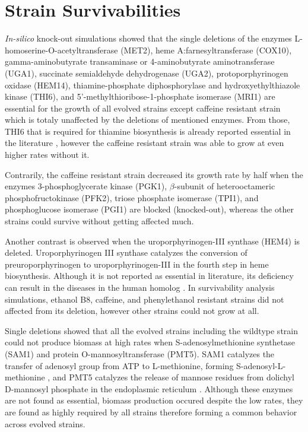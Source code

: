 \section{Strain Survivabilities}
\emph{In-silico} knock-out simulations showed that the single deletions of the enzymes L-homoserine-O-acetyltransferase (MET2), heme A:farnesyltransferase (COX10), gamma-aminobutyrate transaminase or 4-aminobutyrate aminotransferase (UGA1), succinate semialdehyde dehydrogenase (UGA2), protoporphyrinogen oxidase (HEM14), thiamine-phosphate diphosphorylase and hydroxyethylthiazole kinase (THI6), and 5'-methylthioribose-1-phosphate isomerase (MRI1) are essential for the growth of all evolved strains except caffeine resistant strain which is totaly unaffected by the deletions of mentioned enzymes. From those, THI6 that is required for thiamine biosynthesis is already reported essential in the literature \cite{nosaka1994isolation}, however the caffeine resistant strain was able to grow at even higher rates without it.

Contrarily, the caffeine resistant strain decreased its growth rate by half when the enzymes 3-phosphoglycerate kinase (PGK1), $\beta $-subunit of heterooctameric phosphofructokinase (PFK2), triose phosphate isomerase (TPI1), and phosphoglucose isomerase (PGI1) are blocked (knocked-out), whereas the other strains could survive without getting affected much.

Another contrast is observed when the uroporphyrinogen-III synthase (HEM4) is deleted. Uroporphyrinogen III synthase catalyzes the conversion of preuroporphyrinogen to uroporphyrinogen-III in the fourth step in heme biosynthesis\cite{amillet1995isolation}. Although it is not reported as essential in literature, its deficiency can result in the diseases in the human homolog \cite{tan2008identification}. In survivability analysis simulations, ethanol B8, caffeine, and phenylethanol resistant strains did not affected from its deletion, however other strains could not grow at all.

Single deletions showed that all the evolved strains including the wildtype strain could not produce biomass at high rates when S-adenosylmethionine synthetase (SAM1) and protein O-mannosyltransferase (PMT5). SAM1 catalyzes the transfer of adenosyl group from ATP to L-methionine, forming S-adenosyl-L-methionine \cite{chiang1977activation}, and PMT5 catalyzes the release of mannose residues from dolichyl D-mannosyl phosphate in the endoplasmic reticulum \cite{girrbach2003members}. Although these enzymes are not found as essential, biomass production occured despite the low rates, they are found as highly required by all strains therefore forming a common behavior across evolved strains.

